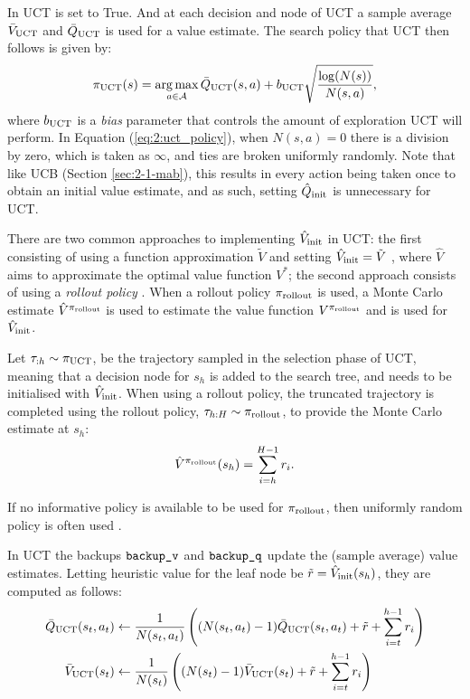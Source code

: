         In UCT \mctsmode\ewe is set to True. And at each decision and node of UCT a sample average ${\bar{V}_{{\textnormal{UCT}}}}$ and ${\bar{Q}_{{\textnormal{UCT}}}}$ is used for a value estimate. The search policy that UCT then follows is given by:
        \begin{align}
            {\pi_{{\textnormal{UCT}}}}(s) = \operatorname*{arg\,max}_{a\in\mathcal{A}} {\bar{Q}_{{\textnormal{UCT}}}}(s,a) + {b_{{\textnormal{UCT}}}} \sqrt{\frac{\log(N(s))}{N(s,a)}}, \label{eq:2:uct_policy}
        \end{align}
        where ${b_{{\textnormal{UCT}}}}$ is a \textit{bias} parameter that controls the amount of exploration UCT will perform. In Equation (\ref{eq:2:uct_policy}), when $N(s,a)=0$ there is a division by zero, which is taken as $\infty$, and ties are broken uniformly randomly. Note that like UCB (Section \ref{sec:2-1-mab}), this results in every action being taken once to obtain an initial value estimate, and as such, setting ${\hat{Q}_{\textnormal{init}}}$ is unnecessary for UCT.   
        
        There are two common approaches to implementing ${\hat{V}_{\textnormal{init}}}$ in UCT: the first consisting of using a function approximation $\tilde{V}$ and setting ${\hat{V}_{\textnormal{init}}}=\tilde{V}$ \cite{alpha_go_zero,alpha_zero,a0c} , where $\hat{V}$ aims to approximate the optimal value function $V^*$; the second approach consists of using a \textit{rollout policy} \cite{mcts_survey,rave,prost,bus}. When a rollout policy ${\pi_{{\textnormal{rollout}}}}$ is used, a Monte Carlo estimate $\hat{V}^{{\pi_{{\textnormal{rollout}}}}}$ is used to estimate the value function $V^{{\pi_{{\textnormal{rollout}}}}}$ and is used for ${\hat{V}_{\textnormal{init}}}$.

        Let $\tau_{:h}\sim{\pi_{{\textnormal{UCT}}}}$, be the trajectory sampled in the selection phase of UCT, meaning that a decision node for $s_h$ is added to the search tree, and needs to be initialised with ${\hat{V}_{\textnormal{init}}}$. When using a rollout policy, the truncated trajectory is completed using the rollout policy, $\tau_{h:H}\sim{\pi_{{\textnormal{rollout}}}}$, to provide the Monte Carlo estimate at $s_h$:
        \begin{align}
            \hat{V}^{{\pi_{{\textnormal{rollout}}}}}(s_h) = \sum_{i=h}^{H-1} r_i. \label{eq:2:rollout_value_estimate}
        \end{align}

        If no informative policy is available to be used for ${\pi_{{\textnormal{rollout}}}}$, then uniformly random policy is often used \cite{mcts_survey,rand_mc_est_orig}.

        In UCT the backups ${\textnormal{\texttt{backup\_v}}}$ and ${\textnormal{\texttt{backup\_q}}}$ update the (sample average) value estimates. Letting heuristic value for the leaf node be $\tilde{r} = {\hat{V}_{\textnormal{init}}}(s_h)$, they are computed as follows:
        \begin{align}
            {\bar{Q}_{{\textnormal{UCT}}}}(s_t,a_t) &\leftarrow 
                \frac{1}{N(s_t,a_t)} \left( (N(s_t,a_t)-1) {\bar{Q}_{{\textnormal{UCT}}}}(s_t,a_t) 
                    + \tilde{r} + \sum_{i=t}^{h-1} r_i \right) \label{eq:2:uct_backup_q} \\
            {\bar{V}_{{\textnormal{UCT}}}}(s_t) &\leftarrow 
                \frac{1}{N(s_t)} \left( (N(s_t)-1) {\bar{V}_{{\textnormal{UCT}}}}(s_t) 
                    + \tilde{r} + \sum_{i=t}^{h-1} r_i \right) \label{eq:2:uct_backup_v} 
        \end{align}  








